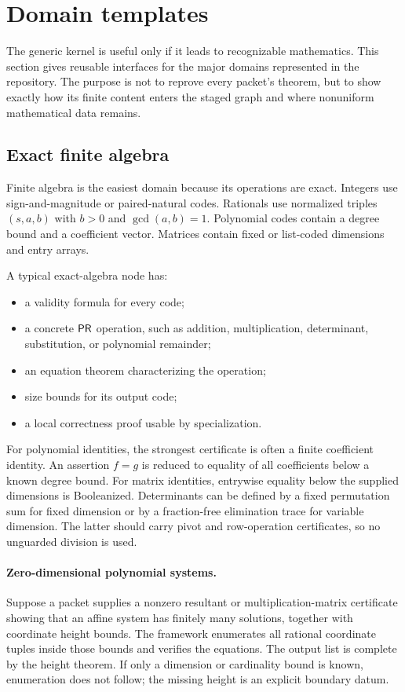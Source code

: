 \section{Domain templates}
\label{sec:domains}

The generic kernel is useful only if it leads to recognizable mathematics.  This section gives reusable
interfaces for the major domains represented in the repository.  The purpose is not to reprove every
packet's theorem, but to show exactly how its finite content enters the staged graph and where nonuniform
mathematical data remains.

\subsection{Exact finite algebra}

Finite algebra is the easiest domain because its operations are exact.  Integers use sign-and-magnitude or
paired-natural codes.  Rationals use normalized triples \((s,a,b)\) with \(b>0\) and
\(\gcd(a,b)=1\).  Polynomial codes contain a degree bound and a coefficient vector.  Matrices contain fixed
or list-coded dimensions and entry arrays.

A typical exact-algebra node has:
\begin{itemize}
  \item a validity formula for every code;
  \item a concrete \(\mathsf{PR}\) operation, such as addition, multiplication, determinant, substitution, or
        polynomial remainder;
  \item an equation theorem characterizing the operation;
  \item size bounds for its output code;
  \item a local correctness proof usable by specialization.
\end{itemize}

For polynomial identities, the strongest certificate is often a finite coefficient identity.  An assertion
\(f=g\) is reduced to equality of all coefficients below a known degree bound.  For matrix identities,
entrywise equality below the supplied dimensions is Booleanized.  Determinants can be defined by a fixed
permutation sum for fixed dimension or by a fraction-free elimination trace for variable dimension.  The
latter should carry pivot and row-operation certificates, so no unguarded division is used.

\paragraph{Zero-dimensional polynomial systems.}
Suppose a packet supplies a nonzero resultant or multiplication-matrix certificate showing that an affine
system has finitely many solutions, together with coordinate height bounds.  The framework enumerates all
rational coordinate tuples inside those bounds and verifies the equations.  The output list is complete by
the height theorem.  If only a dimension or cardinality bound is known, enumeration does not follow; the
missing height is an explicit boundary datum.

